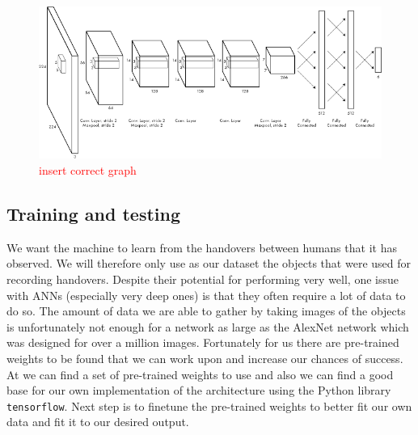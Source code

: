 \begin{figure}
	\centering
	\includegraphics[width=\textwidth]{img/related-work/cnn-architecture.png}
	\caption{\textcolor{red}{insert correct graph}}
	\label{fig:method_cnn_arch}
\end{figure}

\subsection{Training and testing}

We want the machine to learn from the handovers between humans that it has observed. We will therefore only use as our dataset the objects that were used for recording handovers. Despite their potential for performing very well, one issue with ANNs (especially very deep ones) is that they often require a lot of data to do so. The amount of data we are able to gather by taking images of the objects is unfortunately not enough for a network as large as the AlexNet network which was designed for over a million images. Fortunately for us there are pre-trained weights to be found that we can work upon and increase our chances of success. At \parencite{AlexNetImplWeights} we can find a set of pre-trained weights to use and also we can find a good base for our own implementation of the architecture using the Python library \texttt{tensorflow}.  Next step is to finetune the pre-trained weights to better fit our own data and fit it to our desired output.

